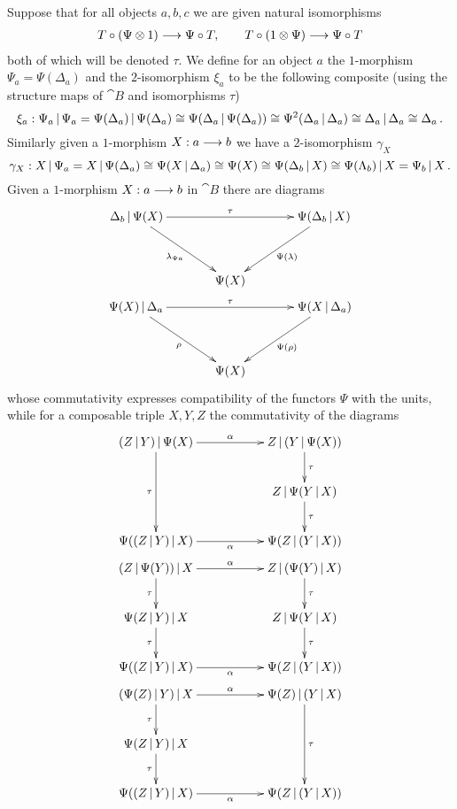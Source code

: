 \documentclass[english,letter paper,12pt,leqno]{article}
\theoremstyle{example}
\numberwithin{equation}{section}
\begin{document}
Suppose that for all objects $a,b,c$ we are given natural isomorphisms
\begin{align*}
T \circ ( \Psi \otimes 1 ) \longrightarrow \Psi \circ T, \qquad T \circ ( 1 \otimes \Psi ) \longrightarrow \Psi \circ T
\end{align*}
both of which will be denoted $\tau$. We define for an object $a$ the $1$-morphism $\Psi_a = \Psi( \Delta_a )$ and the $2$-isomorphism $\xi_a$ to be the following composite (using the structure maps of $\cat{B}$ and isomorphisms $\tau$)
\[
\xi_a: \Psi_a \,|\, \Psi_a = \Psi( \Delta_a ) \,|\, \Psi( \Delta_a ) \cong \Psi( \Delta_a \,|\, \Psi(\Delta_a ) ) \cong \Psi^2( \Delta_a \,|\, \Delta_a ) \cong \Delta_a \,|\, \Delta_a \cong \Delta_a\,.
\]
Similarly given a $1$-morphism $X: a \longrightarrow b$ we have a $2$-isomorphism $\gamma_X$
\[
\gamma_X: X \,|\, \Psi_a = X \,|\, \Psi( \Delta_a ) \cong \Psi( X \,|\, \Delta_a ) \cong \Psi(X) \cong \Psi( \Delta_b \,|\, X ) \cong \Psi( \Lambda_b ) \,|\, X = \Psi_b \,|\, X\,.
\]
Given a $1$-morphism $X: a \longrightarrow b$ in $\cat{B}$ there are diagrams
\begin{gather}
\xymatrix@R+1pc@C+1pc{
\Delta_b \l \Psi (X) \ar[dr]_-{\lambda_{\Psi a}} \ar[rr]^-{\tau} & & \Psi( \Delta_b \l X ) \ar[dl]^-{\Psi( \lambda )}\\
& \Psi(X)
} \label{eq:psiunitor1}\\
\xymatrix@R+1pc@C+1pc{
\Psi(X) \l \Delta_a \ar[rr]^-{\tau}\ar[dr]_-{\rho} & & \Psi( X \l \Delta_a ) \ar[dl]^-{\Psi(\rho)}\\
& \Psi(X)
} \label{eq:psiunitor2}
\end{gather}
whose commutativity expresses compatibility of the functors $\Psi$ with the units, while for a composable triple $X,Y,Z$ the commutativity of the diagrams
\begin{gather}
\xymatrix{
(Z \l Y) \l \Psi(X) \ar[dd]_-{\tau} \ar[rr]^-{\alpha} & & Z \l ( Y \l \Psi(X)) \ar[d]^-{\tau}\\
 & & Z \l \Psi( Y \l X ) \ar[d]^-{\tau}\\
\Psi( (Z \l Y) \l X ) \ar[rr]_-{\alpha} & & \Psi( Z \l ( Y \l X ) )
} \label{eq:psithirdlastdia}\\
\xymatrix{
(Z \l \Psi(Y)) \l X \ar[d]_-{\tau} \ar[rr]^-{\alpha} & & Z \l ( \Psi(Y) \l X) \ar[d]^-{\tau}\\
\Psi( Z \l Y ) \l X \ar[d]_-{\tau} & & Z \l \Psi( Y \l X ) \ar[d]^-{\tau}\\
\Psi( (Z \l Y) \l X ) \ar[rr]_-{\alpha} & & \Psi( Z \l ( Y \l X ) )
} \label{eq:psimiddledia}\\
\xymatrix{
(\Psi(Z) \l Y) \l X \ar[d]_-{\tau} \ar[rr]^-{\alpha} & & \Psi(Z) \l ( Y \l X ) \ar[dd]^-{\tau}\\
\Psi(Z \l Y) \l X \ar[d]_-{\tau} & & \\
\Psi( (Z \l Y) \l X ) \ar[rr]_-{\alpha} & & \Psi( Z \l ( Y \l X ) )
}\label{eq:psilastdia}
\end{gather}
\end{document}
